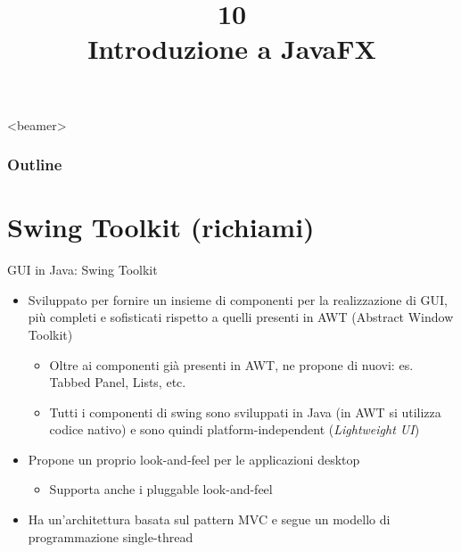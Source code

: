\documentclass[presentation]{beamer}
\title[L10 -- JavaFX, Concurrency]{10\\Introduzione a JavaFX}
\begin{document}
\frame[label=coverpage]{\titlepage}

\begin{frame}<beamer>
 	\frametitle{Outline}
 	\tableofcontents[]
\end{frame}

\section{Swing Toolkit (richiami)}

\begin{frame}{GUI in Java: Swing Toolkit}
\begin{itemize}\itemsep10pt
\item Sviluppato per fornire un insieme di componenti per la realizzazione di GUI, più completi e sofisticati rispetto a quelli presenti in AWT (Abstract Window Toolkit)
\begin{itemize}
\item Oltre ai componenti già presenti in AWT, ne propone di nuovi: es. Tabbed Panel, Lists, etc.
\item Tutti i componenti di swing sono sviluppati in Java (in AWT si utilizza codice nativo) e sono quindi platform-independent (\textit{Lightweight UI})
\end{itemize}
\item Propone un proprio look-and-feel per le applicazioni desktop
\begin{itemize}
\item Supporta anche i pluggable look-and-feel
\end{itemize}
\item Ha un'architettura basata sul pattern MVC e segue un modello di programmazione single-thread
\end{itemize}
\end{frame}
\end{document}
